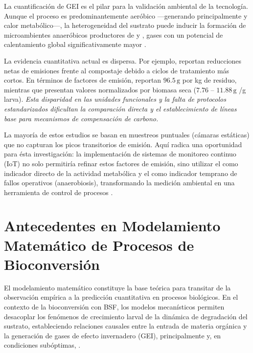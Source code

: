 La cuantificación de GEI es el pilar para la validación ambiental de la tecnología. Aunque el proceso es predominantemente aeróbico —generando principalmente  y calor metabólico—, la heterogeneidad del sustrato puede inducir la formación de microambientes anaeróbicos productores de  y , gases con un potencial de calentamiento global significativamente mayor \parencite{bekkerImpactSubstrateMoisture2021a}.

La evidencia cuantitativa actual es dispersa. Por ejemplo, \textcite{jenkinsProcessingPoultryManure2025} reportan reducciones netas de emisiones frente al compostaje debido a ciclos de tratamiento más cortos. En términos de factores de emisión, \textcite{fuhrmannComprehensiveIndustryrelevantBlack2025a} reportan $96.5\,\mathrm{g}$  por kg de residuo, mientras que \textcite{rossiEstimatingDynamicsGreenhouse2024a} presentan valores normalizados por biomasa seca ($7.76$ -- $11.88\,\mathrm{g}$ /g larva). \textit{Esta disparidad en las unidades funcionales y la falta de protocolos estandarizados dificultan la comparación directa y el establecimiento de líneas base para mecanismos de compensación de carbono.}

La mayoría de estos estudios se basan en muestreos puntuales (cámaras estáticas) que no capturan los picos transitorios de emisión. Aquí radica una oportunidad para ésta investigación: la implementación de sistemas de monitoreo continuo (IoT) no solo permitiría refinar estos factores de emisión, sino utilizar el  como indicador directo de la actividad metabólica y el  como indicador temprano de fallos operativos (anaerobiosis), transformando la medición ambiental en una herramienta de control de procesos \parencite{kamilarisReviewPracticeBig2017,zhangApplicationBigData2024a}.

\section{Antecedentes en Modelamiento Matemático de Procesos de Bioconversión}

El modelamiento matemático constituye la base teórica para transitar de la observación empírica a la predicción cuantitativa en procesos biológicos. En el contexto de la bioconversión con BSF, los modelos mecanísticos permiten desacoplar los fenómenos de crecimiento larval de la dinámica de degradación del sustrato, estableciendo relaciones causales entre la entrada de materia orgánica y la generación de gases de efecto invernadero (GEI), principalmente  y, en condiciones subóptimas, .

